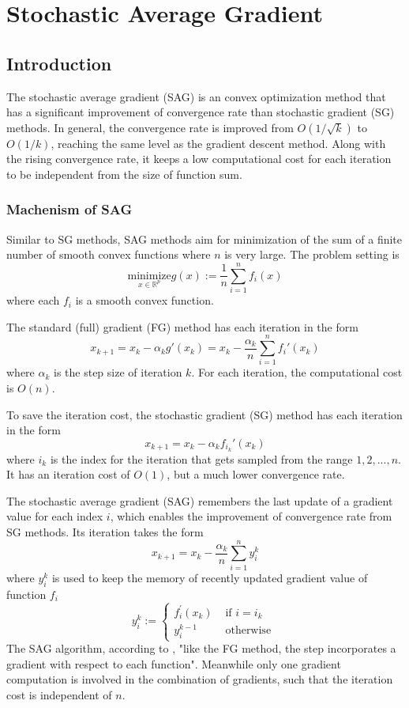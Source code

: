 \chapter{Stochastic Average Gradient}
\label{ch: SAG}

\section{Introduction}
The stochastic average gradient (SAG)\cite{schmidtMinimizingFiniteSums2016} is an convex optimization method that has a significant improvement of convergence rate than stochastic gradient (SG) methods. In general, the convergence rate is improved from $O(1/\sqrt{k})$ to $O(1/k)$, reaching the same level as the gradient descent method. Along with the rising convergence rate, it keeps a low computational cost for each iteration to be independent from the size of function sum.

\subsection{Machenism of SAG}
Similar to SG methods, SAG methods aim for minimization of the sum of a finite number of smooth convex functions where $n$ is very large. The problem setting is
$$
\underset{x \in \mathbb{R}^p}{\text{minimize}} g(x) := \frac{1}{n}\sum^n_{i=1} f_i(x)
$$
where each $f_i$ is a smooth convex function.

The standard (full) gradient (FG) method has each iteration in the form
$$
x_{k+1} = x_k - \alpha_k g\prime (x_k) = x_k - \frac{\alpha_k}{n}\sum^n_{i=1} f_i\prime(x_k)
$$
where $\alpha_k$ is the step size of iteration $k$. For each iteration, the computational cost is $O(n)$.

To save the iteration cost, the stochastic gradient (SG) method has each iteration in the form
$$
x_{k+1} = x_k - \alpha_k f_{i_k}\prime (x_k)
$$
where $i_k$ is the index for the iteration that gets sampled from the range {$1, 2,...,n$}. It has an iteration cost of $O(1)$, but a much lower convergence rate.

The stochastic average gradient (SAG) remembers the last update of a gradient value for each index $i$, which enables the improvement of convergence rate from SG methods. Its iteration takes the form
$$
x_{k+1} = x_k - \frac{\alpha_k}{n} \sum^n_{i=1}y_{i}^{k}
$$
where $y_{i}^{k}$ is used to keep the memory of recently updated gradient value of function $f_i$
$$
y_{i}^{k}:=\left\{\begin{array}{ll}
    f_{i}^{\prime}\left(x_{k}\right) & \text { if } i=i_{k} \\
    y_{i}^{k-1} & \text { otherwise }
    \end{array}\right.
$$
The SAG algorithm, according to \citeauthor{schmidtMinimizingFiniteSums2016}, "like the FG method, the step incorporates a gradient with respect to each function". Meanwhile only one gradient computation is involved in the combination of gradients, such that the iteration cost is independent of $n$.

